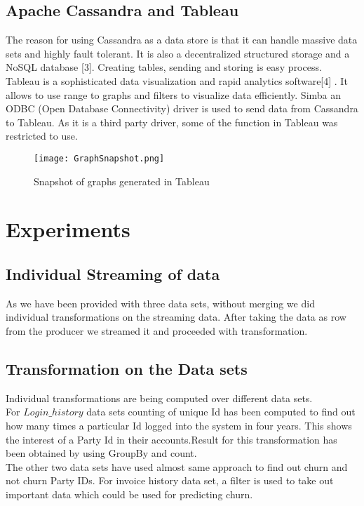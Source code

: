 \documentclass{article}
\begin{document}
\subsection{Apache Cassandra and Tableau}
The reason for using Cassandra as a data store is that it can handle massive data sets and highly fault tolerant. It is also a decentralized structured storage and a NoSQL database [3]. Creating tables, sending and storing is easy process.\\
Tableau is a sophisticated data visualization and rapid analytics software[4] . It allows to use range to graphs and filters to visualize data efficiently.
Simba an ODBC (Open Database Connectivity) driver is used to send data from Cassandra to Tableau. As it is a third party driver, some of the function in Tableau was restricted to use.

\begin{figure}[h!]
   \centering
     \texttt{[image: GraphSnapshot.png]}
     \caption{Snapshot of graphs generated in Tableau}
     \label{fig:universe}
\end{figure}

\newpage
\section{Experiments}

\subsection{Individual Streaming of data}
As we have been provided with three data sets, without merging we did individual transformations on the streaming data. After taking the data as row from the producer we streamed it and proceeded with transformation. 
\subsection{Transformation on the Data sets}
Individual transformations are being computed over different data sets.\\
For $Login\_history$ data sets counting of unique Id has been computed to find out how many times a particular Id logged into the system in four years. This shows the interest of a Party Id in their accounts.Result for this transformation has been obtained by using GroupBy and count.\\
The other two data sets have used almost same approach to find out churn and not churn Party IDs. For invoice history data set, a filter is used to take out important data which could be used for predicting churn.
\end{document}
